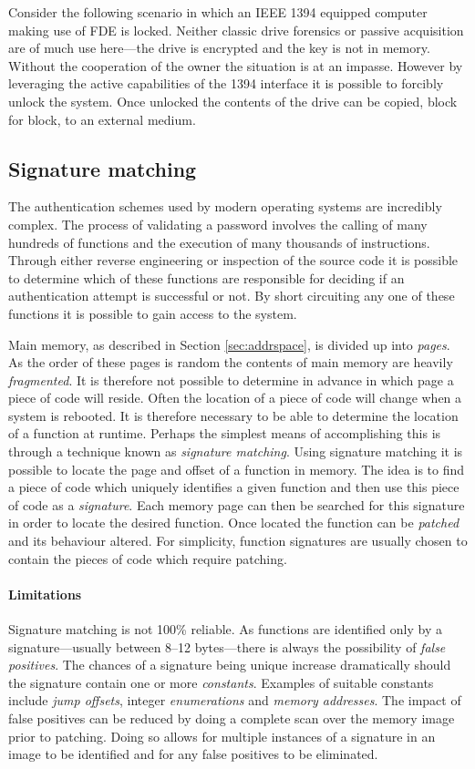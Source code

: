 \documentclass[numbers=noenddot,      %
               abstract,              %
               captions=tableheading, %
               DIV=8]                 %
              {scrartcl}
\begin{document}
Consider the following scenario in which an IEEE 1394 equipped computer
making use of FDE is locked. Neither classic drive forensics or passive
acquisition are of much use here---the drive is encrypted and the key is
not in memory. Without the cooperation of the owner the situation is at
an impasse. However by leveraging the active capabilities of the 1394
interface it is possible to forcibly unlock the system. Once unlocked
the contents of the drive can be copied, block for block, to an external
medium.

\subsection{Signature matching}
The authentication schemes used by modern operating systems are
incredibly complex. The process of validating a password involves the
calling of many hundreds of functions and the execution of many
thousands of instructions. Through either reverse engineering or
inspection of the source code it is possible to determine which of these
functions are responsible for deciding if an authentication attempt is
successful or not. By short circuiting any one of these functions it is
possible to gain access to the system.

Main memory, as described in Section \ref{sec:addrspace}, is divided up
into \emph{pages}. As the order of these pages is random the contents of
main memory are heavily \emph{fragmented}. It is therefore not possible
to determine in advance in which page a piece of code will reside. Often
the location of a piece of code will change when a system is
rebooted. It is therefore necessary to be able to determine the location
of a function at runtime. Perhaps the simplest means of accomplishing
this is through a technique known as \emph{signature matching}. Using
signature matching it is possible to locate the page and offset of a
function in memory. The idea is to find a piece of code which uniquely
identifies a given function and then use this piece of code as a
\emph{signature}. Each memory page can then be searched for this
signature in order to locate the desired function. Once located the
function can be \emph{patched} and its behaviour altered. For
simplicity, function signatures are usually chosen to contain the pieces
of code which require patching.

\paragraph{Limitations}
Signature matching is not 100\% reliable. As functions are identified
only by a signature---usually between 8--12 bytes---there is always the
possibility of \emph{false positives}. The chances of a signature being
unique increase dramatically should the signature contain one or more
\emph{constants}. Examples of suitable constants include \emph{jump
  offsets}, integer \emph{enumerations} and \emph{memory addresses}. The
impact of false positives can be reduced by doing a complete scan over
the memory image prior to patching. Doing so allows for multiple
instances of a signature in an image to be identified and for any false
positives to be eliminated.
\end{document}
